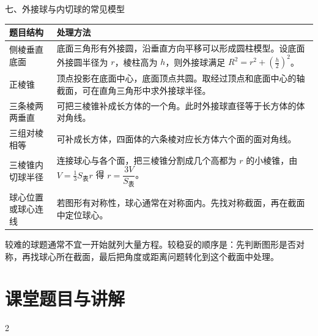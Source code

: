 \documentclass[11pt,a4paper]{ctexart}
\newcommand{\topicteacherproblem}[2]{%
  \teachquestionheader{#1\quad #2}
}
\begin{document}
\begin{teachbox}{七、外接球与内切球的常见模型}
\renewcommand{\arraystretch}{1.35}
\begin{tabularx}{\textwidth}{p{3.2cm}X}
\toprule
题目结构 & 处理方法 \\
\midrule
侧棱垂直底面 & 底面三角形有外接圆，沿垂直方向平移可以形成圆柱模型。设底面外接圆半径为 \(r\)，棱柱高为 \(h\)，则外接球满足 \(R^2=r^2+\left(\frac h2\right)^2\)。\\ \hline
正棱锥 & 顶点投影在底面中心，底面顶点共圆。取经过顶点和底面中心的轴截面，可在直角三角形中求外接球半径。\\ \hline
三条棱两两垂直 & 可把三棱锥补成长方体的一个角。此时外接球直径等于长方体的体对角线。\\ \hline
三组对棱相等 & 可补成长方体，四面体的六条棱对应长方体六个面的面对角线。\\ \hline
三棱锥内切球半径 & 连接球心与各个面，把三棱锥分割成几个高都为 \(r\) 的小棱锥，由 \(V=\frac13S_{\text{表}}r\) 得 \(r=\dfrac{3V}{S_{\text{表}}}\)。\\ \hline
球心位置或球心连线 & 若图形有对称性，球心通常在对称面内。先找对称截面，再在截面中定位球心。\\
\bottomrule
\end{tabularx}

较难的球题通常不宜一开始就列大量方程。较稳妥的顺序是：先判断图形是否对称，再找球心所在截面，最后把角度或距离问题转化到这个截面中处理。
\end{teachbox}

\newpage
\section{课堂题目与讲解}

\topicteacherproblem{检测 1}{平行截面与体积比}
{\small \qSolidTetrahedronVolStem}
\qSolidTetrahedronVolOptions
\begin{center}
  \qSolidTetrahedronVolFigure[1.2]
\end{center}

\begin{paracol}{2}


\switchcolumn
{}

\end{paracol}
\end{document}
